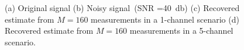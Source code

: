\documentclass{article}
\theoremstyle{definition}
\begin{document}
\begin{figure}[htb]
	\hfill%
	\hfill%
	\caption{(a) Original signal (b) Noisy signal~(SNR =\SI{40}{\decibel}) (c) Recovered estimate from $M=160$ measurements in a \num{1}-channel scenario (d) Recovered estimate from $M=160$ measurements in a \num{5}-channel scenario.}
	\label{fig_synth_noisy}
\end{figure}
\end{document}
